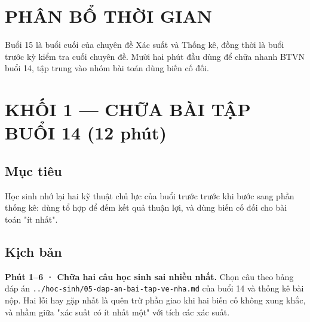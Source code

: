 \documentclass[11pt, a4paper]{article}
\begin{document}

\section{PHÂN BỔ THỜI GIAN}


Buổi 15 là buổi cuối của chuyên đề Xác suất và Thống kê, đồng thời là buổi trước kỳ kiểm tra cuối chuyên đề. Mười hai phút đầu dùng để chữa nhanh BTVN buổi 14, tập trung vào nhóm bài toán dùng biến cố đối.

\section{KHỐI 1 — CHỮA BÀI TẬP BUỔI 14 (12 phút)}

\subsection{Mục tiêu}

Học sinh nhớ lại hai kỹ thuật chủ lực của buổi trước trước khi bước sang phần thống kê: dùng tổ hợp để đếm kết quả thuận lợi, và dùng biến cố đối cho bài toán "ít nhất".

\subsection{Kịch bản}

\textbf{Phút 1–6 · Chữa hai câu học sinh sai nhiều nhất.} Chọn câu theo bảng đáp án \texttt{../hoc-sinh/05-dap-an-bai-tap-ve-nha.md} của buổi 14 và thống kê bài nộp. Hai lỗi hay gặp nhất là quên trừ phần giao khi hai biến cố không xung khắc, và nhầm giữa "xác suất có ít nhất một" với tích các xác suất.
\end{document}
